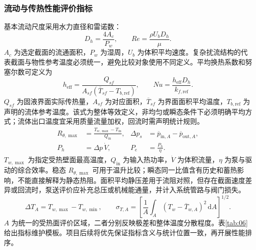 \documentclass[stage2,UTF8,fontset=fandol]{ydzjreport}
\begin{document}
\subsubsection{流动与传热性能评价指标}
基本流动尺度采用水力直径和雷诺数：
\begin{equation}
D_h=\frac{4A_c}{P_w},\qquad Re=\frac{\rho U_bD_h}{\mu}.\label{eq:re}
\end{equation}
$A_c$ 为选定截面的流通面积，$P_w$ 为湿周，$U_b$ 为体积平均速度。复杂扰流结构的代表截面与物性参考温度必须统一，避免比较对象使用不同定义。平均换热系数和努塞尔数可定义为
\begin{equation}
h_{\mathrm{eff}}=\frac{Q_{sf}}{A_{sf}(\overline T_{sf}-T_{b,\mathrm{ref}})},\qquad Nu=\frac{h_{\mathrm{eff}}D_h}{k_{f,\mathrm{ref}}}.\label{eq:nu}
\end{equation}
$Q_{sf}$ 为固液界面实际传热量，$A_{sf}$ 为对应面积，$\overline T_{sf}$ 为界面面积平均温度，$T_{b,\mathrm{ref}}$ 为声明的流体参考温度。该式为整体等效定义，非均匀或瞬态条件下必须明确平均方式；流体出口温度宜采用质量流量加权，回流时需声明统计规则。
\begin{equation}\begin{aligned}
R_{\theta,\max}&=\frac{T_{w,\max}-T_{\mathrm{in}}}{Q_{\mathrm{in}}},&
\Delta p_s&=\overline p_{\mathrm{in},A}-\overline p_{\mathrm{out},A},\\
P_h&=\Delta p\,\dot V,& P_e&=\frac{P_h}{\eta}.
\end{aligned}\label{eq:resistance}
\end{equation}
$T_{w,\max}$ 为指定受热壁面最高温度，$Q_{\mathrm{in}}$ 为输入热功率，$\dot V$ 为体积流量，$\eta$ 为泵与驱动的综合效率。稳态 $R_{\theta,\max}$ 可用于温升比较；瞬态同一比值含有历史和蓄热影响，不能直接解释为静态热阻。面积平均静压差用于流阻对照，但存在截面速度差异或回流时，泵送评价应补充总压或机械能通量，并计入系统管路与阀门损失。
\begin{equation}
\Delta T_A=T_{w,\max}-T_{w,\min},\qquad
\sigma_{T,A}=\left[\frac{1}{A}\int_A(T_w-\overline T_{w,A})^2\,\mathrm dA\right]^{1/2}.\label{eq:uniformity}
\end{equation}
$A$ 为统一的受热面评价区域，二者分别反映极差和整体温度分散程度。表\ref{tab:06}给出指标维护模板。项目后续将优先保证指标含义与统计位置一致，再开展性能排序。
\end{document}
